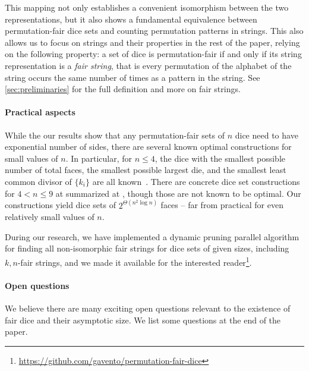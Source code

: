 \documentclass{article}
\begin{document}
\smallskip
This mapping not only establishes a convenient isomorphism between the two representations, but it also shows a fundamental equivalence between permutation-fair dice sets and counting permutation patterns in strings. This also allows us to focus on strings and their properties in the rest of the paper, relying on the following property: a set of dice is permutation-fair if and only if its string representation is a \textit{fair string}, that is every permutation of the alphabet of the string occurs the same number of times as a pattern in the string. See \cref{sec:preliminaries} for the full definition and more on fair strings. 

\paragraph{Practical aspects}
While the our results show that any permutation-fair sets of $n$ dice need to have exponential number of sides, there are several known optimal constructions for small values of $n$. In particular, for $n\leq 4$, the dice with the smallest possible number of total faces, the smallest possible largest die, and the smallest least common divisor of $\{k_i\}$ are all known~\cite{ford2023go, harshbarger2012whogoesfirst}. There are concrete dice set constructions for $4<n\leq 9$ at summarized at \cite{Eric_webpage}, though those are not known to be optimal. Our constructions yield dice sets of $2^{\Theta(n^2 \log n)}$ faces -- far from practical for even relatively small values of $n$.


During our research, we have implemented a dynamic pruning parallel algorithm for finding all non-isomorphic fair strings for dice sets of given sizes, including $k,n$-fair strings, and we made it available for the interested reader\footnote{\url{https://github.com/gavento/permutation-fair-dice}}.

\paragraph{Open questions}
We believe there are many exciting open questions relevant to the existence of fair dice and their asymptotic size. We list some questions at the end of the paper. 
\end{document}
